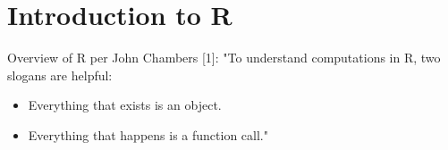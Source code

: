 \section{Introduction to R}
\begin{frame}
	\begin{center}
  		\begin{block}{Overview of R per John Chambers [1]:} 
			"To understand computations in R, two slogans are helpful:
			\begin{itemize}
			        \item Everything that exists is an object.
			        \item Everything that happens is a function call."
			\end{itemize}
		\end{block}
	\end{center} 

\end{frame}

